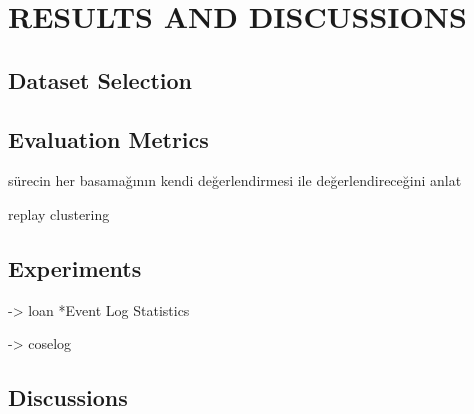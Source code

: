 \chapter{RESULTS AND DISCUSSIONS}
\label{chp:results-and-discussions}
 

\section{Dataset Selection}
\label{sec:dataset-selection}
 

\section{Evaluation Metrics}
\label{sec:evaluation-metrics}
sürecin her basamağının kendi değerlendirmesi ile değerlendireceğini anlat


\label{subsec:process-model-mining-eval}

\label{subsec:performance-indicator-analysis-eval}
		replay 
		clustering

\label{subsec:mismatch-pattern-analysis-eval}


\label{subsec:recommendation-generation-eval}

\section{Experiments}
\label{sec:experiments}

-> loan
*Event Log Statistics

-> coselog

\section{Discussions}
\label{sec:discussions}